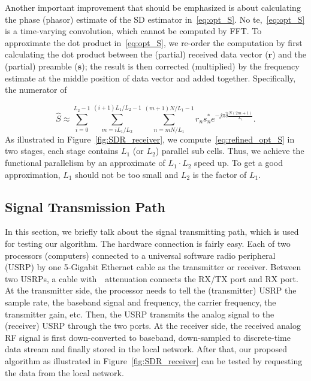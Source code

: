 Another important improvement that should be emphasized is about calculating the phase (phasor) estimate
of the SD estimator in~\eqref{eq:opt_S}. No
te,~\eqref{eq:opt_S} is a time-varying convolution, which cannot be computed by FFT.
To approximate the dot product in~\eqref{eq:opt_S}, we re-order the computation by first calculating the dot product between the (partial) received data vector ($\bm{r}$) and the (partial) preamble ($\bm{s}$);
the result is then corrected (multiplied) by the frequency estimate at the middle position of data vector and added together. Specifically, the numerator of

\begin{equation}
    \label{eq:refined_opt_S}
    \hat{S} \approx \sum_{i=0}^{L_2-1} \sum_{m=iL_1/L_2}^{(i+1)L_1/L_2-1}
    \sum_{n=mN/L_1}^{(m+1)N/L_1-1}r_ns_n^* 
    e^{-j\pi \hat{\delta}\frac{N(2m+1)}{L_1}}.
  \end{equation}
As illustrated in Figure~\ref{fig:SDR_receiver}, we compute~\eqref{eq:refined_opt_S} in two stages, each
stage contains $L_1$ (or $L_2$) parallel sub cells. 
Thus, we achieve the functional parallelism by an approximate of $L_1 \cdot L_2$ speed up.
To get a good approximation, $L_1$ should not be too small and 
$L_2$ is the factor of $L_1$.

\subsection{Signal Transmission Path}

In this section, we briefly talk about the signal transmitting path, which is used 
for testing our algorithm. The hardware connection is fairly easy. 
Each of two processors (computers) connected to a universal software radio peripheral (USRP) 
by one 5-Gigabit Ethernet cable as the transmitter or receiver. Between two USRPs,
a cable with~\dB~attenuation connects the RX/TX port and RX port.
At the transmitter side, the processor needs to tell the (transmitter) USRP the sample rate, 
the baseband signal and frequency, the carrier frequency, the transmitter gain, etc. 
Then, the USRP transmits the analog signal to the (receiver) USRP through the two ports.
At the receiver side, the received analog RF signal is first down-converted to baseband, down-sampled to 
discrete-time data stream and finally stored in the local network. After that, our proposed algorithm as illustrated
in Figure~\ref{fig:SDR_receiver} can be tested by requesting the data from the local network.

